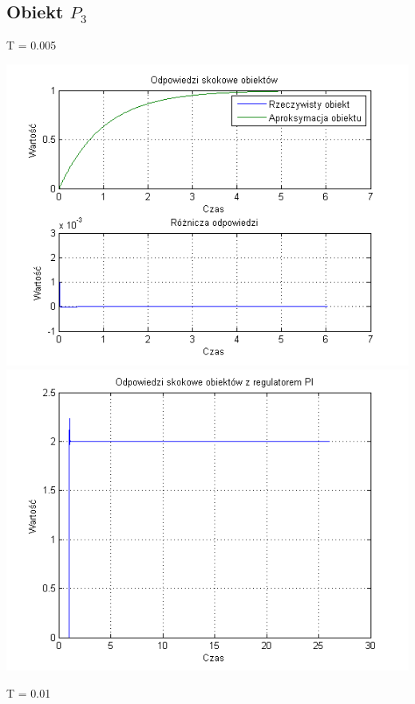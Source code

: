 \documentclass[10pt,a4paper]{article}
\begin{document}
\subsection{Obiekt $P_3$}
T = 0.005
\begin{center}
\includegraphics[scale=1]{images/jeden/skrypt_85.png}\\
\includegraphics[scale=1]{images/jeden/skrypt_86.png}\\
\end{center}
\newpage
T = 0.01
\end{document}
